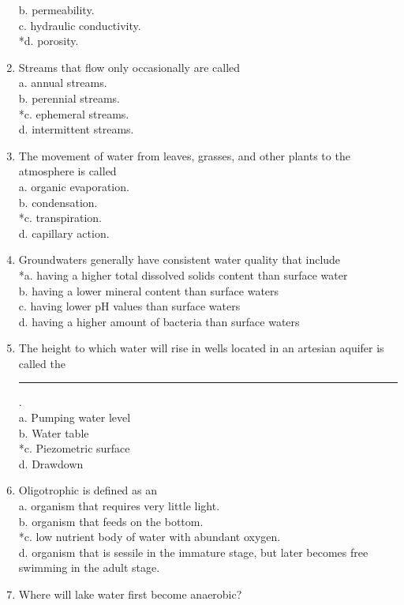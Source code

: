 \begin{enumerate}
b. permeability.\\
c. hydraulic conductivity.\\
*d. porosity.\\
\item Streams that flow only occasionally are called\\
a. annual streams.\\
b. perennial streams.\\
*c. ephemeral streams.\\
d. intermittent streams.\\
\item The movement of water from leaves, grasses, and other plants to the atmosphere is called\\
a. organic evaporation.\\
b. condensation.\\
*c. transpiration.\\
d. capillary action.\\
\item Groundwaters generally have consistent water quality that include\\
*a. having a higher total dissolved solids content than surface water\\
b. having a lower mineral content than surface waters\\
c. having lower $\mathrm{pH}$ values than surface waters\\
d. having a higher amount of bacteria than surface waters\\
\item The height to which water will rise in wells located in an artesian aquifer is called the \rule{1.5cm}{0.5pt}.\\
a.  Pumping water level\\
b.  Water table\\
*c. Piezometric surface\\
d.  Drawdown\\
\item Oligotrophic is defined as an\\
a. organism that requires very little light.\\
b. organism that feeds on the bottom.\\
*c. low nutrient body of water with abundant oxygen.\\
d. organism that is sessile in the immature stage, but later becomes free swimming in the adult stage.\\
\item Where will lake water first become anaerobic?\\

\end{enumerate}
